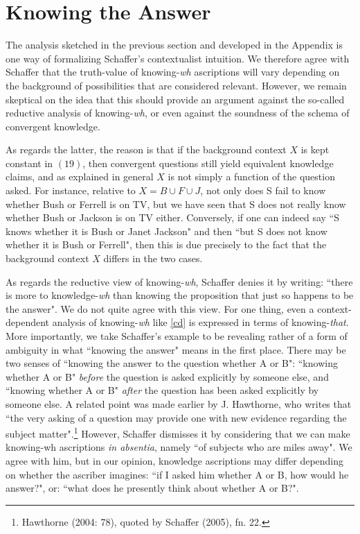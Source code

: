 \section{Knowing the Answer}

The analysis sketched in the previous section and developed in the
Appendix is one way of formalizing Schaffer's contextualist
intuition. We therefore agree with Schaffer that the truth-value
of knowing-\emph{wh} ascriptions will vary depending on the
background of possibilities that are considered relevant. However,
we remain skeptical on the idea that this should provide an
argument against the so-called reductive analysis of
knowing-\emph{wh}, or even against the soundness of the schema of
convergent knowledge.

As regards the latter, the reason is that if the background
context $X$ is kept constant in $(19)$, then convergent questions
still yield equivalent knowledge claims, and as explained in
general $X$ is not simply a function of the question asked. For
instance, relative to $X=B\cup F\cup J$, not only does S fail to
know whether Bush or Ferrell is on TV, but we have seen that S
does not really know whether Bush or Jackson is on TV either.
Conversely, if one can indeed say ``S knows whether it is Bush or
Janet Jackson" and then ``but S does not know whether it is Bush
or Ferrell", then this is due precisely to the fact that the
background context $X$ differs in the two cases.

As regards the reductive view of knowing-\emph{wh}, Schaffer
denies it by writing: ``there is more to knowledge-\emph{wh} than
knowing the proposition that just so happens to be the answer". We
do not quite agree with this view. For one thing, even a
context-dependent analysis of knowing-\emph{wh} like \ref{cd} is
expressed in terms of knowing-\emph{that}. More importantly, we
take Schaffer's example to be revealing rather of a form of
ambiguity in what ``knowing the answer" means in the first place.
There may be two senses of ``knowing the answer to the question
whether A or B": ``knowing whether A or B" \emph{before} the
question is asked explicitly by someone else, and ``knowing
whether A or B" \emph{after} the question has been asked
explicitly by someone else. A related point was made earlier by J.
Hawthorne, who writes that ``the very asking of a question may
provide one with new evidence regarding the subject
matter".\footnote{Hawthorne (2004: 78), quoted by Schaffer (2005),
fn. 22.} However, Schaffer dismisses it by considering that we can
make knowing-wh ascriptions \emph{in absentia}, namely ``of
subjects who are miles away". We agree with him, but in our
opinion, knowledge ascriptions may differ depending on whether the
ascriber imagines: ``if I asked him whether A or B, how would he
answer?", or: ``what does he presently think about whether A or
B?".

